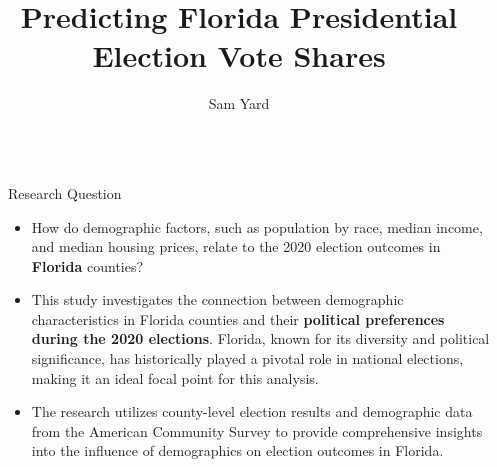 \documentclass[xcolor=dvipsnames]{beamer}
\title{Predicting Florida Presidential Election Vote Shares} %
\author{{\huge Sam Yard}}
\newlength{\sepwid}
\newlength{\onecolwid}
\begin{document}

\setlength{\belowcaptionskip}{2ex} %
\setlength\belowdisplayshortskip{2ex} %

\begin{frame}[t] %

\begin{columns}[t] %

\begin{column}{\sepwid}\end{column} %

\begin{column}{\onecolwid} %


\begin{alertblock}{Research Question}
\begin{itemize}
\item[\textcolor{black}{\textbullet}] How do demographic factors, such as population by race, median income, and median housing prices, relate to the 2020 election outcomes in \textbf{Florida} counties?
\item[\textcolor{black}{\textbullet}]  This study investigates the connection between demographic characteristics in Florida counties and their \textbf{political preferences during the 2020 elections}. Florida, known for its diversity and political significance, has historically played a pivotal role in national elections, making it an ideal focal point for this analysis. 
\item[\textcolor{black}{\textbullet}] The research utilizes county-level election results and demographic data from the American Community Survey to provide comprehensive insights into the influence of demographics on election outcomes in Florida.
\end{itemize}
\end{alertblock}


\end{column}
\end{columns}
\end{frame}
\end{document}
